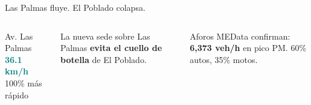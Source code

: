 \documentclass[aspectratio=169, 11pt]{beamer}
\newcommand{\highlight}[1]{\textcolor{teal}{\textbf{#1}}}
\begin{document}
\begin{frame}{Las Palmas fluye. El Poblado colapsa.}
\begin{columns}[T]
\vspace{4pt}
\begin{exampleblock}{\small Av. Las Palmas}
\centering\Large \highlight{36.1 km/h}\\
\small 100\% más rápido
\end{exampleblock}

\vspace{8pt}
{\small La nueva sede sobre Las Palmas \textbf{evita el cuello de botella} de El Poblado.}

\vspace{6pt}
{\small Aforos MEData confirman: \textbf{6,373 veh/h} en pico PM. 60\% autos, 35\% motos.}
\end{columns}
\end{frame}

\end{document}
